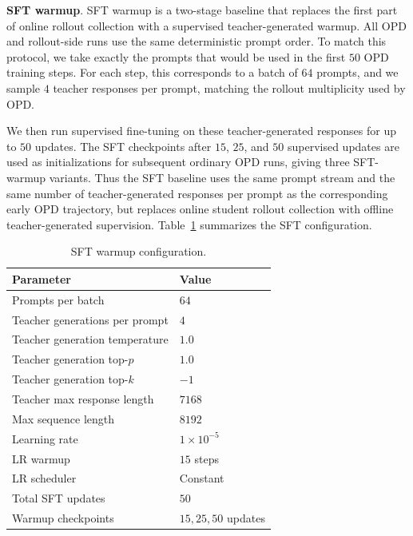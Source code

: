 \documentclass[11pt]{article}
\renewcommand{\paragraph}[1]{\vspace{1mm}\noindent\textbf{#1}.}
\begin{document}
\paragraph{SFT warmup}
SFT warmup is a two-stage baseline that replaces the first part of online rollout collection with a supervised teacher-generated warmup.
All OPD and rollout-side runs use the same deterministic prompt order.
To match this protocol, we take exactly the prompts that would be used in the first $50$ OPD training steps.
For each step, this corresponds to a batch of $64$ prompts, and we sample $4$ teacher responses per prompt, matching the rollout multiplicity used by OPD.

We then run supervised fine-tuning on these teacher-generated responses for up to $50$ updates.
The SFT checkpoints after $15$, $25$, and $50$ supervised updates are used as initializations for subsequent ordinary OPD runs, giving three SFT-warmup variants.
Thus the SFT baseline uses the same prompt stream and the same number of teacher-generated responses per prompt as the corresponding early OPD trajectory, but replaces online student rollout collection with offline teacher-generated supervision.
Table~\ref{tab:sft-warmup-hparams} summarizes the SFT configuration.

\begin{table}[t]
\centering
\small
\setlength{\tabcolsep}{6pt}
\renewcommand{\arraystretch}{1.1}
\begin{tabular}{@{}ll@{}}
\toprule
\textbf{Parameter} & \textbf{Value} \\
\midrule
Prompts per batch & $64$ \\
Teacher generations per prompt & $4$ \\
Teacher generation temperature & $1.0$ \\
Teacher generation top-$p$ & $1.0$ \\
Teacher generation top-$k$ & $-1$ \\
Teacher max response length & $7168$ \\
Max sequence length & $8192$ \\
Learning rate & $1 \times 10^{-5}$ \\
LR warmup & $15$ steps \\
LR scheduler & Constant \\
Total SFT updates & $50$ \\
Warmup checkpoints & $15, 25, 50$ updates \\
\bottomrule
\end{tabular}
\caption{SFT warmup configuration.}
\label{tab:sft-warmup-hparams}
\end{table}
\end{document}
